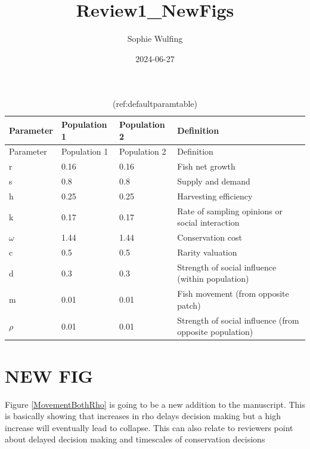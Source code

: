 \documentclass[
]{article}
\title{Review1\_NewFigs}
\author{Sophie Wulfing}
\date{2024-06-27}
\begin{document}
\maketitle

\begin{longtable}[]{@{}llll@{}}
\caption{\label{tab:DefaultParamTable}(ref:defaultparamtable) \label{DefaultParamTable}}\tabularnewline
\toprule\noalign{}
Parameter & Population 1 & Population 2 & Definition \\
\midrule\noalign{}
\endfirsthead
\toprule\noalign{}
Parameter & Population 1 & Population 2 & Definition \\
\midrule\noalign{}
\endhead
\bottomrule\noalign{}
\endlastfoot
r & 0.16 & 0.16 & Fish net growth \\
s & 0.8 & 0.8 & Supply and demand \\
h & 0.25 & 0.25 & Harvesting efficiency \\
k & 0.17 & 0.17 & Rate of sampling opinions or social interaction \\
\(\omega\) & 1.44 & 1.44 & Conservation cost \\
c & 0.5 & 0.5 & Rarity valuation \\
d & 0.3 & 0.3 & Strength of social influence (within population) \\
m & 0.01 & 0.01 & Fish movement (from opposite patch) \\
\(\rho\) & 0.01 & 0.01 & Strength of social influence (from opposite population) \\
\end{longtable}

\section{NEW FIG}\label{new-fig}

Figure \ref{MovementBothRho} is going to be a new addition to the manuscript. This is basically showing that increases in rho delays decision making but a high increase will eventually lead to collapse. This can also relate to reviewers point about delayed decision making and timescales of conservation decisions
\end{document}
